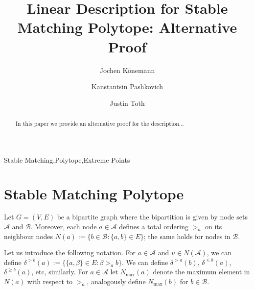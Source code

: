 \documentclass[preprint]{elsarticle}
\begin{document}
\begin{frontmatter}



\title{Linear Description for Stable Matching Polytope: Alternative Proof}
\author[co]{Jochen K\"{o}nemann}
\author[co]{Kanstantsin Pashkovich}
\author[co]{Justin Toth}
\address[co]{Department of Combinatorics and Optimization, University of Waterloo, Canada}


\begin{abstract}
In this paper we provide an alternative proof for the description...
\end{abstract}
\begin{keyword}
Stable Matching\sep Polytope\sep Extreme Points
\end{keyword}
\end{frontmatter}
\section{Stable Matching Polytope}

Let $G = (V, E)$ be a bipartite graph  where the bipartition is given by node sets $\mathcal{A}$ and $\mathcal{B}$. Moreover, each node $a\in\mathcal{A}$ defines a total ordering $>_a$ on its neighbour nodes $N(a):=\{b \in\mathcal{B}: \{a,b\}\in E\}$;  the same holds for nodes in $\mathcal{B}$.

Let us introduce the following notation. For $a\in \mathcal{A}$ and $u \in N(\mathcal{A})$, we can define $\delta^{>b}(a):=\{ \{a,\beta\}\in E: \beta>_a b \}$. We can define $\delta^{>a}(b)$, $\delta^{\leq b}(a)$, $\delta^{\geq b}(a)$, etc, similarly. For $a\in \mathcal{A}$ let $N_{\max}(a)$ denote the maximum element in $N(a)$ with respect to $>_a$, analogously define $N_{\max}(b)$ for $b\in\mathcal{B}$. 
\end{document}
